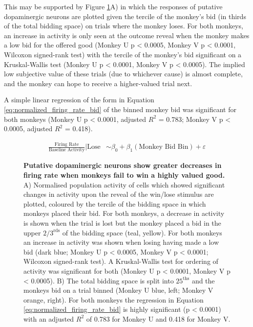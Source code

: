 This may be supported by Figure \ref{fig:winlose_loss_regression}A) in which the responses of putative dopaminergic neurons are plotted given the tercile of the monkey's bid (in thirds of the total bidding space) on trials where the monkey loses. For both monkeys, an increase in activity is only seen at the outcome reveal when the monkey makes a low bid for the offered good (Monkey U p < 0.0005, Monkey V p < 0.0001, Wilcoxon signed-rank test) with the tercile of the monkey's bid significant on a Kruskal-Wallis test (Monkey U p < 0.0001, Monkey V p < 0.0005). The implied low subjective value of these trials (due to whichever cause) is almost complete, and the monkey can hope to receive a higher-valued trial next.

A simple linear regression of the form in Equation \ref{eq:normalized_firing_rate_bid} of the binned monkey bid was significant for both monkeys (Monkey U p < 0.0001, adjusted $R^2$ = 0.783; Monkey V p < 0.0005, adjusted $R^2$ = 0.418).

\begin{align}
\frac{\text{Firing Rate}}{\text{Baseline Activity}} | \text{Lose} &\sim \beta_0 + \beta_1(\text{Monkey Bid Bin}) + \varepsilon \label{eq:normalized_firing_rate_bid}
\end{align}

\begin{figure}[p] 
\centering    

\caption[Putative dopaminergic neurons show greater decreases in firing rate when monkeys fail to win a highly valued good.]{\textbf{Putative dopaminergic neurons show greater decreases in firing rate when monkeys fail to win a highly valued good.} A) Normalised population activity of cells which showed significant changes in activity upon the reveal of the win/lose stimulus are plotted, coloured by the tercile of the bidding space in which monkeys placed their bid. For both monkeys, a decrease in activity is shown when the trial is lost but the monkey placed a bid in the upper $2/3^{\text{rds}}$ of the bidding space (teal, yellow). For both monkeys an increase in activity was shown when losing having made a low bid (dark blue; Monkey U p < 0.0005, Monkey V p < 0.0001; Wilcoxon signed-rank test). A Kruskal-Wallis test for ordering of activity was significant for both (Monkey U p < 0.0001, Monkey V p < 0.0005). B) The total bidding space is split into $25^{\text{ths}}$ and the monkeys bid on a trial binned (Monkey U blue, left; Monkey V orange, right). For both monkeys the regression in Equation \ref{eq:normalized_firing_rate_bid} is highly significant (p < 0.0001) with an adjusted $R^2$ of 0.783 for Monkey U and 0.418 for Monkey V.}
\label{fig:winlose_loss_regression}
\end{figure}

